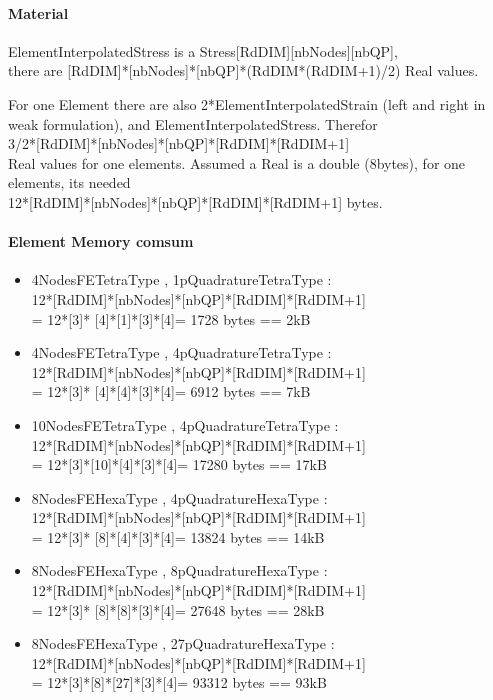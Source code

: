 \documentclass[a4paper,10pt]{article}
\begin{document}
\paragraph{Material }
ElementInterpolatedStress is a Stress[RdDIM][nbNodes][nbQP], \\ there are [RdDIM]*[nbNodes]*[nbQP]*(RdDIM*(RdDIM+1)/2) Real values.

For one Element there are also 2*ElementInterpolatedStrain (left and right in weak formulation), and ElementInterpolatedStress. Therefor \\ 3/2*[RdDIM]*[nbNodes]*[nbQP]*[RdDIM]*[RdDIM+1] \\ Real values for one elements. Assumed a Real is a double (8bytes), for one elements, its needed \\ 12*[RdDIM]*[nbNodes]*[nbQP]*[RdDIM]*[RdDIM+1] bytes.
\paragraph{Element Memory comsum }
\begin{itemize}
\item 4NodesFETetraType  , 1pQuadratureTetraType : \\ 12*[RdDIM]*[nbNodes]*[nbQP]*[RdDIM]*[RdDIM+1] \\ = 12*[3]* [4]*[1]*[3]*[4]=  1728 bytes ==  2kB
\item 4NodesFETetraType  , 4pQuadratureTetraType : \\ 12*[RdDIM]*[nbNodes]*[nbQP]*[RdDIM]*[RdDIM+1] \\ = 12*[3]* [4]*[4]*[3]*[4]=  6912 bytes ==  7kB
\item 10NodesFETetraType  , 4pQuadratureTetraType :\\ 12*[RdDIM]*[nbNodes]*[nbQP]*[RdDIM]*[RdDIM+1] \\ = 12*[3]*[10]*[4]*[3]*[4]= 17280 bytes == 17kB
\item 8NodesFEHexaType   ,  4pQuadratureHexaType :\\ 12*[RdDIM]*[nbNodes]*[nbQP]*[RdDIM]*[RdDIM+1] \\ = 12*[3]* [8]*[4]*[3]*[4]= 13824 bytes == 14kB
\item 8NodesFEHexaType   ,  8pQuadratureHexaType :\\ 12*[RdDIM]*[nbNodes]*[nbQP]*[RdDIM]*[RdDIM+1] \\ = 12*[3]* [8]*[8]*[3]*[4]= 27648 bytes == 28kB
\item 8NodesFEHexaType   ,  27pQuadratureHexaType :\\ 12*[RdDIM]*[nbNodes]*[nbQP]*[RdDIM]*[RdDIM+1]\\  = 12*[3]*[8]*[27]*[3]*[4]= 93312 bytes == 93kB
\end{itemize}
\end{document}
